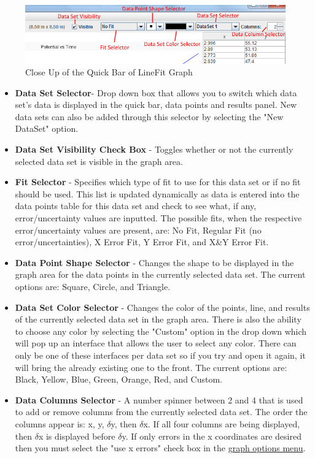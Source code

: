 \documentclass[titlepage,12pt]{article}
\begin{document}
\begin{figure}[ht!]
\centering
\includegraphics[width=15cm]{images/quickBar.png}
\caption{Close Up of the Quick Bar of LineFit Graph}
\end{figure}

\begin{itemize}
\item \textbf{Data Set Selector}- Drop down box that allows you to switch which data set's data is displayed in the quick bar, data points and results panel. New data sets can also be added through this selector by selecting the "New DataSet" option.
\item \textbf{Data Set Visibility Check Box} - Toggles whether or not the currently selected data set is visible in the graph area.
\item \textbf{Fit Selector} - Specifies which type of fit to use for this data set or if no fit should be used. This list is updated dynamically as data is entered into the data points table for this data set and check to see what, if any, error/uncertainty values are inputted. The possible fits, when the respective error/uncertainty values are present, are: No Fit, Regular Fit (no error/uncertainties), X Error Fit, Y Error Fit, and X\&Y Error Fit.
\item \textbf{Data Point Shape Selector} - Changes the shape to be displayed in the graph area for the data points in the currently selected data set. The current options are: Square, Circle, and Triangle.
\item \textbf{Data Set Color Selector} - Changes the color of the points, line, and results of the currently selected data set in the graph area. There is also the ability to choose any color by selecting the "Custom" option in the drop down which will pop up an interface that allows the user to select any color. There can only be one of these interfaces per data set so if you try and open it again, it will bring the already existing one to the front. The current options are: Black, Yellow, Blue, Green, Orange, Red, and Custom.
\item \textbf{Data Columns Selector} - A number spinner between 2 and 4 that is used to add or remove columns from the currently selected data set. The order the columns appear is: x, y, $\delta$y, then $\delta$x. If all four columns are being displayed, then $\delta$x is displayed before $\delta$y. If only errors in the x coordinates are desired then you must select the "use x errors" check box in the \hyperref[sec:options]{graph options menu}.
\end{itemize}
\end{document}
